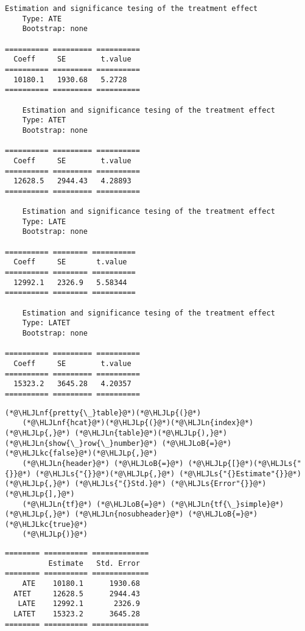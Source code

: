 \documentclass[12pt,a4paper]{article}
\newcommand{\HLJLkc}[1]{\textcolor[RGB]{59,151,46}{\textit{#1}}}
\newcommand{\HLJLn}[1]{#1}
\newcommand{\HLJLnf}[1]{\textcolor[RGB]{66,102,213}{#1}}
\newcommand{\HLJLs}[1]{\textcolor[RGB]{201,61,57}{#1}}
\newcommand{\HLJLoB}[1]{\textcolor[RGB]{102,102,102}{\textbf{#1}}}
\newcommand{\HLJLp}[1]{#1}
\begin{document}
\begin{lstlisting}
Estimation and significance tesing of the treatment effect
    Type: ATE
    Bootstrap: none
    
========== ========= ==========
  Coeff     SE        t.value
========== ========= ==========
  10180.1   1930.68   5.2728
========== ========= ==========

    Estimation and significance tesing of the treatment effect
    Type: ATET
    Bootstrap: none
    
========== ========= ==========
  Coeff     SE        t.value
========== ========= ==========
  12628.5   2944.43   4.28893
========== ========= ==========

    Estimation and significance tesing of the treatment effect
    Type: LATE
    Bootstrap: none
    
========== ======== ==========
  Coeff     SE       t.value
========== ======== ==========
  12992.1   2326.9   5.58344
========== ======== ==========

    Estimation and significance tesing of the treatment effect
    Type: LATET
    Bootstrap: none
    
========== ========= ==========
  Coeff     SE        t.value
========== ========= ==========
  15323.2   3645.28   4.20357
========== ========= ==========
\end{lstlisting}


\begin{lstlisting}
(*@\HLJLnf{pretty{\_}table}@*)(*@\HLJLp{(}@*)
    (*@\HLJLnf{hcat}@*)(*@\HLJLp{(}@*)(*@\HLJLn{index}@*)(*@\HLJLp{,}@*) (*@\HLJLn{table}@*)(*@\HLJLp{),}@*) (*@\HLJLn{show{\_}row{\_}number}@*) (*@\HLJLoB{=}@*) (*@\HLJLkc{false}@*)(*@\HLJLp{,}@*) 
    (*@\HLJLn{header}@*) (*@\HLJLoB{=}@*) (*@\HLJLp{[}@*)(*@\HLJLs{"{}}@*) (*@\HLJLs{"{}}@*)(*@\HLJLp{,}@*) (*@\HLJLs{"{}Estimate"{}}@*)(*@\HLJLp{,}@*) (*@\HLJLs{"{}Std.}@*) (*@\HLJLs{Error"{}}@*)(*@\HLJLp{],}@*) 
    (*@\HLJLn{tf}@*) (*@\HLJLoB{=}@*) (*@\HLJLn{tf{\_}simple}@*)(*@\HLJLp{,}@*) (*@\HLJLn{nosubheader}@*) (*@\HLJLoB{=}@*) (*@\HLJLkc{true}@*)
    (*@\HLJLp{)}@*)
\end{lstlisting}

\begin{lstlisting}
======== ========== =============
          Estimate   Std. Error
======== ========== =============
    ATE    10180.1      1930.68
  ATET     12628.5      2944.43
   LATE    12992.1       2326.9
  LATET    15323.2      3645.28
======== ========== =============
\end{lstlisting}
\end{document}
